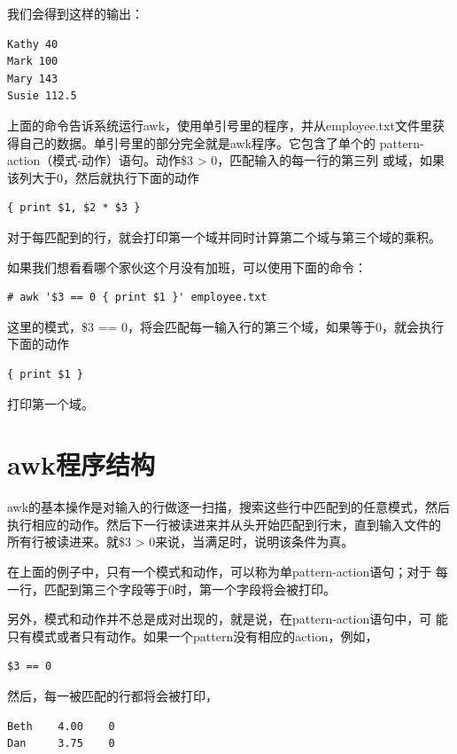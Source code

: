 我们会得到这样的输出：

\begin{verbatim}
Kathy 40
Mark 100
Mary 143
Susie 112.5
\end{verbatim}

上面的命令告诉系统运行awk，使用单引号里的程序，并从employee.txt文件里获
得自己的数据。单引号里的部分完全就是awk程序。它包含了单个的
pattern-action（模式-动作）语句。动作\$3 >  0，匹配输入的每一行的第三列
或域，如果该列大于0，然后就执行下面的动作

\begin{verbatim}
{ print $1, $2 * $3 }
\end{verbatim}

对于每匹配到的行，就会打印第一个域并同时计算第二个域与第三个域的乘积。

如果我们想看看哪个家伙这个月没有加班，可以使用下面的命令：

\begin{verbatim}
# awk '$3 == 0 { print $1 }' employee.txt
\end{verbatim}

这里的模式，\$3 == 0，将会匹配每一输入行的第三个域，如果等于0，就会执行
下面的动作

\begin{verbatim}
{ print $1 }
\end{verbatim}

打印第一个域。

\section{awk程序结构}

awk的基本操作是对输入的行做逐一扫描，搜索这些行中匹配到的任意模式，然后
执行相应的动作。然后下一行被读进来并从头开始匹配到行末，直到输入文件的
所有行被读进来。就\$3 > 0来说，当满足时，说明该条件为真。

在上面的例子中，只有一个模式和动作，可以称为单pattern-action语句；对于
每一行，匹配到第三个字段等于0时，第一个字段将会被打印。

另外，模式和动作并不总是成对出现的，就是说，在pattern-action语句中，可
能只有模式或者只有动作。如果一个pattern没有相应的action，例如，

\begin{verbatim}
$3 == 0
\end{verbatim}

然后，每一被匹配的行都将会被打印，

\begin{verbatim}
Beth    4.00    0
Dan     3.75    0
\end{verbatim}

